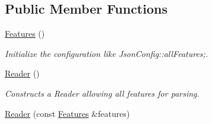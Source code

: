 \subsection*{Public Member Functions}
\begin{DoxyCompactItemize}
\item 
\hypertarget{protocol_json_1_1_j_s_o_n___a_p_i_ad689444ef42491b89324975696f0ed58}{\hyperlink{protocol_json_1_1_j_s_o_n___a_p_i_ad689444ef42491b89324975696f0ed58}{Features} ()}\label{protocol_json_1_1_j_s_o_n___a_p_i_ad689444ef42491b89324975696f0ed58}

\begin{DoxyCompactList}\small\item\em Initialize the configuration like Json\-Config\-::all\-Features;. \end{DoxyCompactList}\item 
\hypertarget{protocol_json_1_1_j_s_o_n___a_p_i_a8d5594b46204fb65661a8c96c015ea54}{\hyperlink{protocol_json_1_1_j_s_o_n___a_p_i_a8d5594b46204fb65661a8c96c015ea54}{Reader} ()}\label{protocol_json_1_1_j_s_o_n___a_p_i_a8d5594b46204fb65661a8c96c015ea54}

\begin{DoxyCompactList}\small\item\em Constructs a Reader allowing all features for parsing. \end{DoxyCompactList}\item 
\hypertarget{protocol_json_1_1_j_s_o_n___a_p_i_ada43ccb4bc15d260528629cb7aebb8ff}{\hyperlink{protocol_json_1_1_j_s_o_n___a_p_i_ada43ccb4bc15d260528629cb7aebb8ff}{Reader} (const \hyperlink{protocol_json_1_1_j_s_o_n___a_p_i_ad689444ef42491b89324975696f0ed58}{Features} \&features)}\label{protocol_json_1_1_j_s_o_n___a_p_i_ada43ccb4bc15d260528629cb7aebb8ff}


\end{DoxyCompactItemize}

